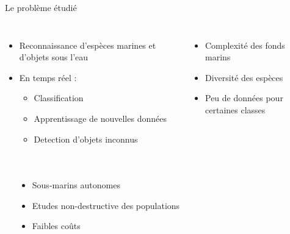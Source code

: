\documentclass{falconbeamer}
\institute{
	\begin{center}
		\texttt{[image: molamola.png]}
	\end{center}
}
\begin{document}
\maketitle

\begin{frame}{Le problème étudié}
	\bigskip
	\begin{columns}[T]
			\begin{itemize}
				\item Reconnaissance d'espèces marines et d'objets sous l'eau
				\item En temps réel :
				\begin{itemize}
					\item Classification
					\item Apprentissage de nouvelles données
					\item Detection d'objets inconnus
				\end{itemize}
			\end{itemize}
		
			\begin{itemize}
				\item Complexité des fonds marins
				\item Diversité des espèces
				\item Peu de données pour certaines classes
			\end{itemize}
	\end{columns}
	\begin{columns}
			\begin{center}
			\end{center}
			\begin{itemize}
				\item Sous-marins autonomes
				\item Etudes non-destructive des populations
				\item Faibles coûts
			\end{itemize}
	\end{columns}
\end{frame}
\end{document}
